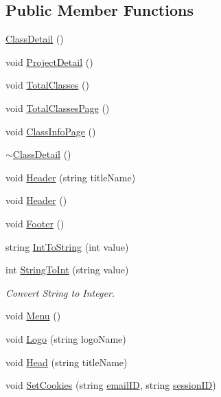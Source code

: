 \subsection*{Public Member Functions}
\begin{DoxyCompactItemize}
\item 
\hyperlink{classClassDetail_a70975c4ff964e21958e31f2020cdc643}{Class\-Detail} ()
\item 
void \hyperlink{classClassDetail_a71de8308b8c43fed23a959fe39096ce4}{Project\-Detail} ()
\item 
void \hyperlink{classClassDetail_a7f2913b5735282db82ab3ff363b14ce4}{Total\-Classes} ()
\item 
void \hyperlink{classClassDetail_a68ba42aa7102ab0394366dd836c87790}{Total\-Classes\-Page} ()
\item 
void \hyperlink{classClassDetail_a509620b067879d20c329d1bb33d509d7}{Class\-Info\-Page} ()
\item 
\hyperlink{classClassDetail_a2aeaf33b0a277a897aad308cffde211a}{$\sim$\-Class\-Detail} ()
\item 
void \hyperlink{classInputDetail_ae55dcc0e15b85d302a09046b145330bb}{Header} (string title\-Name)
\item 
void \hyperlink{classPageLayout_a7726061f0653245f644a05807fa92472}{Header} ()
\item 
void \hyperlink{classInputDetail_acbc05b1bc6a371cf0a52222cc95e467d}{Footer} ()
\item 
string \hyperlink{classInputDetail_ad0a78d7c864bcccf7813a526d59573be}{Int\-To\-String} (int value)
\item 
int \hyperlink{classInputDetail_aaf532dd61f0aee82b116fef2da8e821f}{String\-To\-Int} (string value)
\begin{DoxyCompactList}\small\item\em Convert String to Integer. \end{DoxyCompactList}\item 
void \hyperlink{classPageLayout_a49af1dca286bbee9432192a7b3c00332}{Menu} ()
\item 
void \hyperlink{classPageLayout_ae60235c6af48e3ebbc6343d02456da0c}{Logo} (string logo\-Name)
\item 
void \hyperlink{classPageLayout_ae50907d56f0ba7a85f7ccfdeafa45bcc}{Head} (string title\-Name)
\item 
void \hyperlink{classPageLayout_a449b4dde24cf3dc10299dc3c7bfc0e9c}{Set\-Cookies} (string \hyperlink{classInputDetail_ad3f1db4fddbe0d4efbf1d5bc74d52257}{email\-I\-D}, string \hyperlink{classPageLayout_ab796c4a12a3f9c089881085e508e2a1c}{session\-I\-D})

\end{DoxyCompactItemize}
